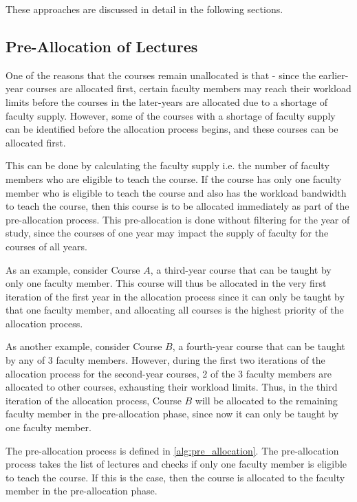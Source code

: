 These approaches are discussed in detail in the following sections.

\subsection{Pre-Allocation of Lectures}
\label{sec:pre_allocation}

One of the reasons that the courses remain unallocated is that - since the earlier-year courses are allocated first, certain faculty members may reach their workload limits before the courses in the later-years are allocated due to a shortage of faculty supply. However, some of the courses with a shortage of faculty supply can be identified before the allocation process begins, and these courses can be allocated first.

This can be done by calculating the faculty supply i.e. the number of faculty members who are eligible to teach the course. If the course has only one faculty member who is eligible to teach the course and also has the workload bandwidth to teach the course, then this course is to be allocated immediately as part of the pre-allocation process. This pre-allocation is done without filtering for the year of study, since the courses of one year may impact the supply of faculty for the courses of all years.

As an example, consider Course $A$, a third-year course that can be taught by only one faculty member. This course will thus be allocated in the very first iteration of the first year in the allocation process since it can only be taught by that one faculty member, and allocating all courses is the highest priority of the allocation process.

As another example, consider Course $B$, a fourth-year course that can be taught by any of 3 faculty members. However, during the first two iterations of the allocation process for the second-year courses, 2 of the 3 faculty members are allocated to other courses, exhausting their workload limits. Thus, in the third iteration of the allocation process, Course $B$ will be allocated to the remaining faculty member in the pre-allocation phase, since now it can only be taught by one faculty member.

The pre-allocation process is defined in \autoref{alg:pre_allocation}. The pre-allocation process takes the list of lectures and checks if only one faculty member is eligible to teach the course. If this is the case, then the course is allocated to the faculty member in the pre-allocation phase.

